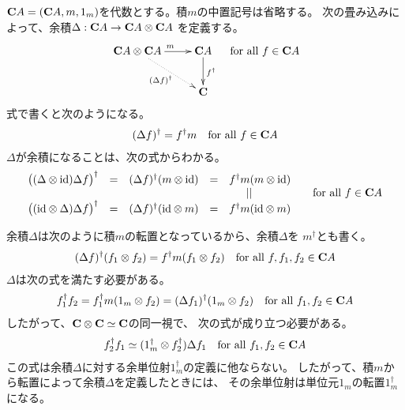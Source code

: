 	${\mathbf{C}}A=({\mathbf{C}}A,m,1_m)$を代数とする。積$m$の中置記号は省略する。
	次の畳み込みによって、余積$\Delta:{\mathbf{C}}A\to {\mathbf{C}}A\otimes {\mathbf{C}}A$
	を定義する。
	\begin{equation*}\xymatrix{
		\mybf{C}A\otimes\mybf{C}A \ar[r]^{m} \ar@{.>}[rd]_{(\Delta f)^\dag} 
			& \mybf{C}A \ar[d]^{f^\dag} \\
		& \mybf{C}
	} \quad\text{for all } f\in\mybf{C}A
	\end{equation*}
	式で書くと次のようになる。
	\begin{equation*}\begin{split} %
		(\Delta f)^\dag = f^\dag m \quad\text{for all }f\in\mybf{C}A
	\end{split}\end{equation*} %
	$\Delta$が余積になることは、次の式からわかる。
	\begin{equation*}\begin{array}{cccccc} %
		\bigl((\Delta\otimes \myid)\Delta f\bigr)^\dag
		&=& (\Delta f)^\dag(m\otimes \myid) &=& f^\dag m(m\otimes \myid) \\
		&&&& ||\quad\quad & \quad\text{for all }f\in\mybf{C}A \\
		\bigl((\myid\otimes \Delta)\Delta f\bigr)^\dag
		&=& (\Delta f)^\dag(\myid\otimes m) &=& f^\dag m(\myid\otimes m) \\
	\end{array}\end{equation*} %

	余積$\Delta$は次のように積$m$の転置となっているから、余積$\Delta$を
	$m^\dag$とも書く。
	\begin{equation*}\begin{split} %
		(\Delta f)^\dag(f_1\otimes f_2) = f^\dag m(f_1\otimes f_2)
		\quad\text{for all }f,f_1,f_2\in\mybf{C}A
	\end{split}\end{equation*} %
	$\Delta$は次の式を満たす必要がある。
	\begin{equation*}\begin{split} %
		f_1^\dag f_2 = f_1^\dag m(1_m\otimes f_2) 
		= (\Delta f_1)^\dag(1_m\otimes f_2)
		\quad\text{for all }f_1,f_2\in\mybf{C}A
	\end{split}\end{equation*} %
	したがって、${\mathbf{C}}\otimes{\mathbf{C}} \simeq {\mathbf{C}}$の同一視で、
	次の式が成り立つ必要がある。
	\begin{equation*}\begin{split} %
		f_2^\dag f_1 \simeq (1_m^\dag\otimes f_2^\dag)\Delta f_1
		\quad\text{for all }f_1,f_2\in\mybf{C}A
	\end{split}\end{equation*} %
	この式は余積$\Delta$に対する余単位射$1_m^\dag$の定義に他ならない。
	したがって、積$m$から転置によって余積$\Delta$を定義したときには、
	その余単位射は単位元$1_m$の転置$1_m^\dag$になる。

